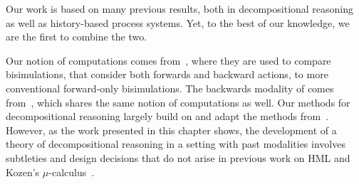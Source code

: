 Our work is based on many previous results, both in decompositional reasoning
as well as history-based process systems. Yet, to the best of our knowledge, we
are the first to combine the two.

Our notion of computations comes from~\cite{DeNicola:1990}, where they are used
to compare bisimulations, that consider both forwards and backward actions, to
more conventional forward-only bisimulations. The backwards modality of \HMLpast
comes from~\cite{HennessyS85}, which shares the same notion of computations
as well.
Our methods for decompositional reasoning largely build on and adapt the methods
from~\cite{anna87,Larsen91,Fokkink03b}.
However, as the work presented in this chapter shows, the development of a theory 
of decompositional reasoning in a setting with past modalities involves subtleties 
and design decisions that do not arise in previous work on HML and Kozen's 
$\mu$-calculus~\cite{Koz83}.